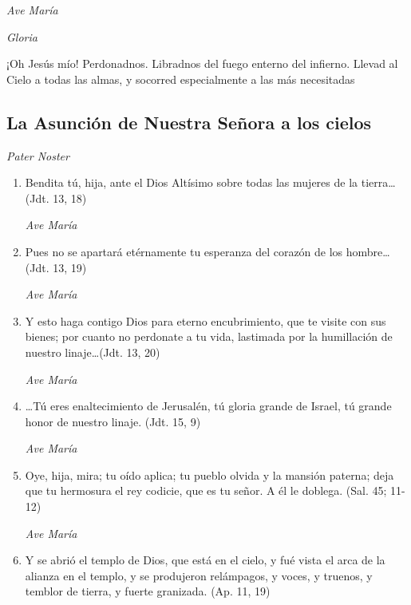\documentclass[a4paper,11pt, oneside]{report}
\begin{document}
        \textit{Ave María} \par
        \indent\textit{Gloria} \par
        \indent¡Oh Jesús mío! Perdonadnos. Libradnos del fuego enterno del infierno. Llevad al Cielo a todas las almas, y socorred especialmente a las más 
        necesitadas

      \subsection*{La Asunción de Nuestra Señora a los cielos}

        \textit{Pater Noster}

        \begin{enumerate}

          \item Bendita tú, hija, ante el Dios Altísimo sobre todas las mujeres de la tierra\ldots (Jdt. 13, 18)

          \textit{Ave María}

          \item Pues no se apartará etérnamente tu esperanza del corazón de los hombre\ldots (Jdt. 13, 19)

          \textit{Ave María}

          \item Y esto haga contigo Dios para eterno encubrimiento, que te visite con sus bienes; por cuanto no perdonate
          a tu vida, lastimada por la humillación de nuestro linaje\ldots (Jdt. 13, 20)

          \textit{Ave María}

          \item {\ldots}Tú eres enaltecimiento de Jerusalén, tú gloria grande de Israel, tú grande honor de nuestro linaje. (Jdt. 15, 9)

          \textit{Ave María}

          \item Oye, hija, mira; tu oído aplica; tu pueblo olvida y la mansión paterna; deja que tu hermosura
          el rey codicie, que es tu señor. A él le doblega. (Sal. 45; 11-12)

          \textit{Ave María}

          \item Y se abrió el templo de Dios, que está en el cielo, y fué vista el arca de la alianza en el templo,
          y se produjeron relámpagos, y voces, y truenos, y temblor de tierra, y fuerte granizada. (Ap. 11, 19)


\end{enumerate}
\end{document}
